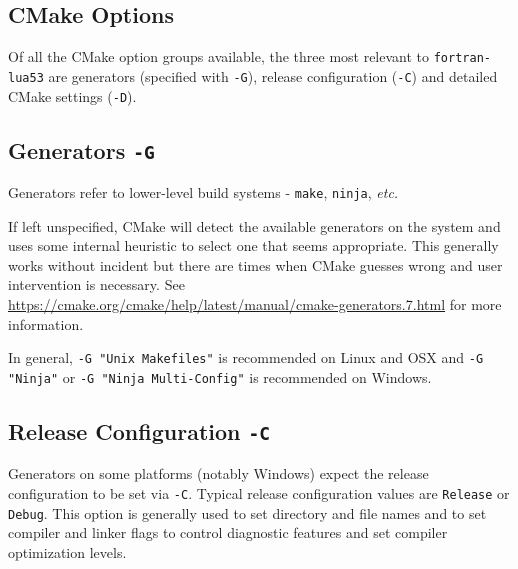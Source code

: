 
\subsection{CMake Options}

Of all the CMake option groups available, the three most relevant to
\texttt{fortran-lua53} are generators (specified with \texttt{-G}), release
configuration (\texttt{-C}) and detailed CMake settings (\texttt{-D}).

\subsection{Generators \texttt{-G}}

Generators refer to lower-level build systems - \texttt{make},
\texttt{ninja}, \textit{etc.}

If left unspecified, CMake will detect the available generators on the
system and uses some internal heuristic to select one that seems
appropriate. This generally works without incident but there are times
when CMake guesses wrong and user intervention is necessary.
See \url{https://cmake.org/cmake/help/latest/manual/cmake-generators.7.html}
for more information.

In general, \texttt{-G "Unix Makefiles"} is recommended on Linux and OSX
and \texttt{-G "Ninja"} or \texttt{-G "Ninja Multi-Config"} is
recommended on Windows.

\subsection{Release Configuration \texttt{-C}}

Generators on some platforms (notably Windows) expect the release
configuration to be set via \texttt{-C}. Typical release configuration
values are \texttt{Release} or \texttt{Debug}. This option is generally
used to set directory and file names and to set compiler and linker
flags to control diagnostic features and set compiler optimization
levels.

